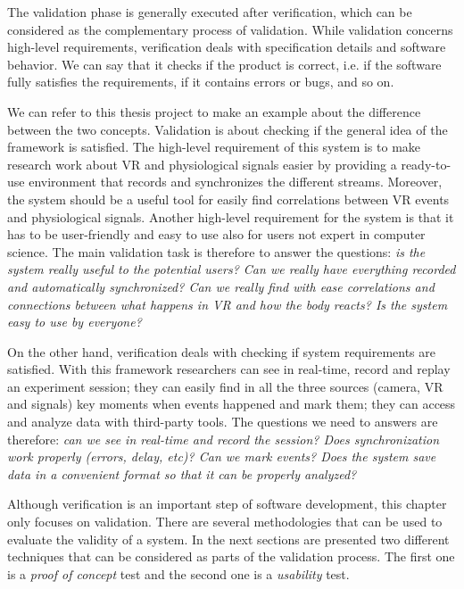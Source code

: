 \documentclass[binding=0.6cm,LaM]{sapthesis}
\begin{document}
The validation phase is generally executed after verification, which can be considered as the complementary process of validation. While validation concerns high-level requirements, verification deals with specification details and software behavior. We can say that it checks if the product is correct, i.e. if the software fully satisfies the requirements, if it contains errors or bugs, and so on. 

We can refer to this thesis project to make an example about the difference between the two concepts. Validation is about checking if the general idea of the framework is satisfied. The high-level requirement of this system is to make research work about VR and physiological signals easier by providing a ready-to-use environment that records and synchronizes the different streams. Moreover, the system should be a useful tool for easily find correlations between VR events and physiological signals. Another high-level requirement for the system is that it has to be user-friendly and easy to use also for users not expert in computer science.
The main validation task is therefore to answer the questions: \textit{is the system really useful to the potential users? Can we really have everything recorded and automatically synchronized? Can we really find with ease correlations and connections between what happens in VR and how the body reacts? Is the system easy to use by everyone?}

On the other hand, verification deals with checking if system requirements are satisfied. With this framework researchers can see in real-time, record and replay an experiment session; they can easily find in all the three sources (camera, VR and signals) key moments when events happened and mark them; they can access and analyze data with third-party tools. The questions we need to answers are therefore: \textit{can we see in real-time and record the session? Does synchronization work properly (errors, delay, etc)? Can we mark events? Does the system save data in a convenient format so that it can be properly analyzed?}

Although verification is an important step of software development, this chapter only focuses on validation. There are several methodologies that can be used to evaluate the validity of a system. In the next sections are presented two different techniques that can be considered as parts of the validation process. The first one is a \textit{proof of concept} test and the second one is a \textit{usability} test. 
\end{document}

